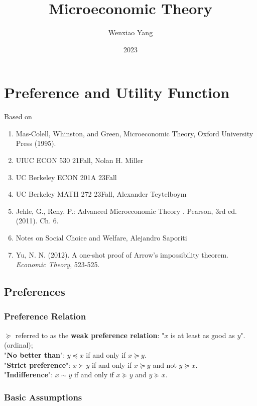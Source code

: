 \documentclass[11pt]{elegantbook}
\title{\textbf{Microeconomic Theory}}
\author{Wenxiao Yang}
\institute{Haas School of Business, University of California Berkeley}
\date{2023}
\begin{document}
\maketitle
\frontmatter
\tableofcontents
\mainmatter



\chapter{Preference and Utility Function}
Based on
\begin{enumerate}[$\circ$]
    \item Mas-Colell, Whinston, and Green, Microeconomic Theory, Oxford University Press (1995).
    \item UIUC ECON 530 21Fall, Nolan H. Miller
    \item UC Berkeley ECON 201A 23Fall
    \item UC Berkeley MATH 272 23Fall, Alexander Teytelboym
    \item  Jehle, G., Reny, P.: Advanced Microeconomic Theory . Pearson, 3rd ed. (2011). Ch. 6.
    \item Notes on Social Choice and Welfare, Alejandro Saporiti
    \item Yu, N. N. (2012). A one-shot proof of Arrow's impossibility theorem. \textit{Economic Theory}, 523-525.
\end{enumerate}


\section{Preferences}

\subsection{Preference Relation}
\begin{definition}
    \normalfont
    $\succeq$ referred to as the \textbf{weak preference relation}: "$x$ is at least as good as $y$". (ordinal);\\
    "\textbf{No better than}": $y \preceq x$ if and only if $x \succeq y$.\\
    "\textbf{Strict preference}": $x \succ y$ if and only if $x \succeq y$ and not $y \succeq x$.\\
    "\textbf{Indifference}": $x \sim y$ if and only if $x \succeq y$ and $y \succeq x$.
\end{definition}


\subsection{Basic Assumptions}
\end{document}
